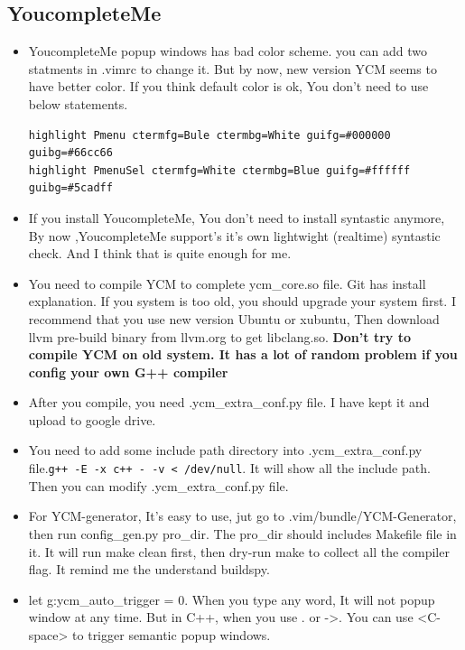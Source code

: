 \documentclass[a4paper,12pt,twoside]{book}
\begin{document}
\subsection{YoucompleteMe}

\begin{itemize}
\item YoucompleteMe popup windows has bad color scheme. you can add two statments in .vimrc to change it. But by now, new version YCM seems to have better color. If you think default color is ok, You don't need to use below statements. 
\begin{verbatim}
highlight Pmenu ctermfg=Bule ctermbg=White guifg=#000000 guibg=#66cc66
highlight PmenuSel ctermfg=White ctermbg=Blue guifg=#ffffff guibg=#5cadff
\end{verbatim}

\item If you install YoucompleteMe, You don't need to install syntastic anymore, By now ,YoucompleteMe support's it's own lightwight (realtime) syntastic check. And I think that is quite enough for me.  

\item You need to compile YCM to complete ycm\_core.so file. Git has install explanation. If you system is too old, you should upgrade your system first. I recommend that you use new version Ubuntu or xubuntu, Then download llvm pre-build binary from llvm.org to get libclang.so. \textbf{Don't try to compile YCM on old system. It has a lot of random problem if you config your own G++ compiler}

\item After you compile, you need .ycm\_extra\_conf.py file. I have kept it and upload to google drive.

\item You need to add some include path directory into .ycm\_extra\_conf.py file.\verb=g++ -E -x c++ - -v < /dev/null=. It will show all the include path. Then you can modify .ycm\_extra\_conf.py file.

\item For YCM-generator, It's easy to use, jut go to .vim/bundle/YCM-Generator, then run config\_gen.py pro\_dir. The pro\_dir should includes Makefile file in it.  It will run make clean first, then dry-run make to collect all the compiler flag. It remind me the understand buildspy. 

\item let g:ycm\_auto\_trigger = 0. When you type any word, It will not popup window at any time. But in C++, when you use . or ->. You can use <C-space> to trigger semantic popup windows.


\end{itemize}
\end{document}
